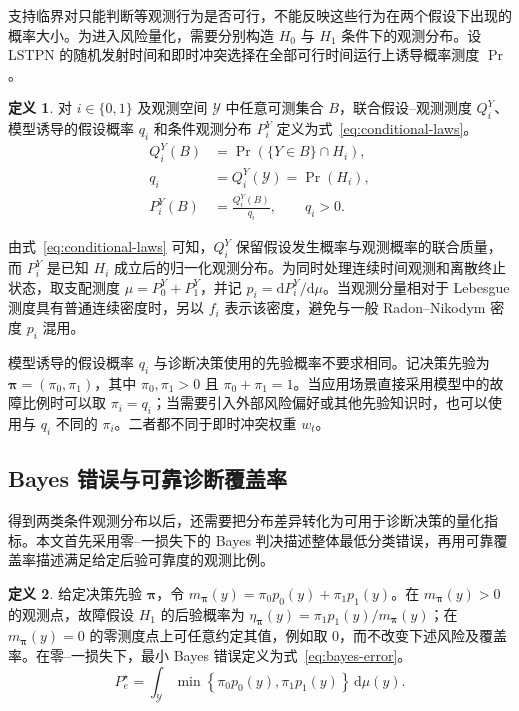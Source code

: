 \documentclass[master,fontset=ubuntu]{shnuthesis}
\theoremstyle{definition}
\newtheorem{thesisdefinition}{定义}
\begin{document}
支持临界对只能判断等观测行为是否可行，不能反映这些行为在两个假设下出现的概率大小。为进入风险量化，需要分别构造 \(H_0\) 与 \(H_1\) 条件下的观测分布。设 LSTPN 的随机发射时间和即时冲突选择在全部可行时间运行上诱导概率测度 \(\Pr\)。

\begin{thesisdefinition}
\label{def:conditional-observation-law}
对 \(i\in\{0,1\}\) 及观测空间 \(\mathcal Y\) 中任意可测集合 \(B\)，联合假设--观测测度 \(Q_i^Y\)、模型诱导的假设概率 \(q_i\) 和条件观测分布 \(P_i^Y\) 定义为式~\eqref{eq:conditional-laws}。
\begin{equation}
\begin{aligned}
Q_i^Y(B)
&=
\Pr\!\left(\{Y\in B\}\cap H_i\right),\\
q_i
&=
Q_i^Y(\mathcal Y)
=
\Pr(H_i),\\
P_i^Y(B)
&=
\frac{Q_i^Y(B)}{q_i},
\qquad q_i>0.
\end{aligned}
\label{eq:conditional-laws}
\end{equation}
\end{thesisdefinition}

由式~\eqref{eq:conditional-laws} 可知，\(Q_i^Y\) 保留假设发生概率与观测概率的联合质量，而 \(P_i^Y\) 是已知 \(H_i\) 成立后的归一化观测分布。为同时处理连续时间观测和离散终止状态，取支配测度 \(\mu=P_0^Y+P_1^Y\)，并记 \(p_i=\mathrm dP_i^Y/\mathrm d\mu\)。当观测分量相对于 Lebesgue 测度具有普通连续密度时，另以 \(f_i\) 表示该密度，避免与一般 Radon--Nikodym 密度 \(p_i\) 混用。

模型诱导的假设概率 \(q_i\) 与诊断决策使用的先验概率不要求相同。记决策先验为 \(\boldsymbol\pi=(\pi_0,\pi_1)\)，其中 \(\pi_0,\pi_1>0\) 且 \(\pi_0+\pi_1=1\)。当应用场景直接采用模型中的故障比例时可以取 \(\pi_i=q_i\)；当需要引入外部风险偏好或其他先验知识时，也可以使用与 \(q_i\) 不同的 \(\pi_i\)。二者都不同于即时冲突权重 \(w_t\)。

\subsection{Bayes 错误与可靠诊断覆盖率}

得到两类条件观测分布以后，还需要把分布差异转化为可用于诊断决策的量化指标。本文首先采用零--一损失下的 Bayes 判决描述整体最低分类错误，再用可靠覆盖率描述满足给定后验可靠度的观测比例。

\begin{thesisdefinition}
\label{def:bayes-error}
给定决策先验 \(\boldsymbol\pi\)，令 \(m_{\boldsymbol\pi}(y)=\pi_0p_0(y)+\pi_1p_1(y)\)。在 \(m_{\boldsymbol\pi}(y)>0\) 的观测点，故障假设 \(H_1\) 的后验概率为
\(\eta_{\boldsymbol\pi}(y)=\pi_1p_1(y)/m_{\boldsymbol\pi}(y)\)；在 \(m_{\boldsymbol\pi}(y)=0\) 的零测度点上可任意约定其值，例如取 \(0\)，而不改变下述风险及覆盖率。在零--一损失下，最小 Bayes 错误定义为式~\eqref{eq:bayes-error}。
\begin{equation}
P_e^\star
=
\int_{\mathcal Y}
\min\!\left\{
\pi_0p_0(y),
\pi_1p_1(y)
\right\}
\,\mathrm d\mu(y).
\label{eq:bayes-error}
\end{equation}
\end{thesisdefinition}
\end{document}
